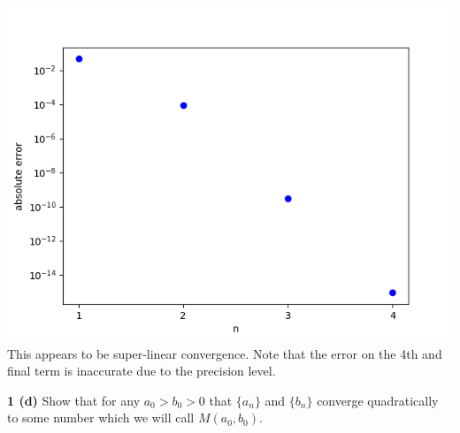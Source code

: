 \documentclass[12pt]{article}
\begin{document}
	\includegraphics[scale=.65]{Figure_1} \\
	This appears to be super-linear convergence. Note that the error on the 4th and final term is inaccurate due to the precision level. \bigbreak

\hspace{-7 ex}\textbf{1 (d) } Show that for any $a_{0} > b_{0} > 0$ that $\{a_{n}\}$ and $\{b_{n}\}$ converge quadratically to
	some number which we will call $M(a_{0}, b_{0})$. \bigbreak
	
\end{document}
